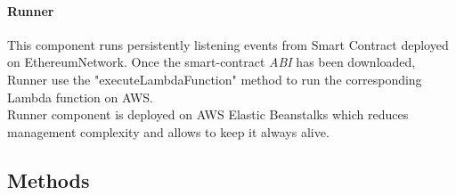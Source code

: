 \paragraph{Runner}
This component runs persistently listening events from Smart Contract deployed on Ethereum\glo Network. Once the smart-contract \textit{ABI\glo} has been downloaded, Runner use the "executeLambdaFunction" method to run the corresponding Lambda function on AWS.\\ Runner component is deployed on AWS Elastic Beanstalks which reduces management complexity and allows to keep it always alive.


\subsection{Methods}

